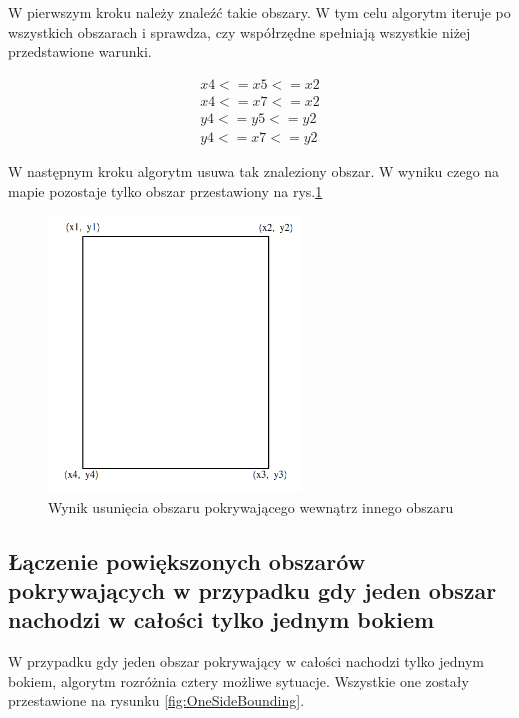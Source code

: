 W pierwszym kroku należy znaleźć takie obszary. W tym celu algorytm iteruje po wszystkich obszarach i sprawdza, czy współrzędne spełniają wszystkie niżej przedstawione warunki.

\begin{equation}
\begin{split}
x4 <= x5 <= x2 \\
x4 <= x7 <= x2 \\
y4 <= y5 <= y2 \\
y4 <= x7 <= y2
\end{split}
\end{equation}

W następnym kroku algorytm usuwa tak znaleziony obszar. W wyniku czego na mapie pozostaje tylko obszar przestawiony na rys.\ref{fig:boundingBoxInsideRemoved}

\begin{figure}[h]
\caption{Wynik usunięcia obszaru pokrywającego wewnątrz innego obszaru}
\label{fig:boundingBoxInsideRemoved}
\centering
\includegraphics[width=0.6\textwidth]{boundingBoxInsideRemoved}
\end{figure}

\newpage
\subsection{Łączenie powiększonych obszarów pokrywających w przypadku gdy jeden obszar nachodzi w całości tylko jednym bokiem }

W przypadku gdy jeden obszar pokrywający w całości nachodzi tylko jednym bokiem, algorytm rozróżnia cztery możliwe sytuacje. Wszystkie one zostały przestawione na rysunku \ref{fig:OneSideBounding}.




